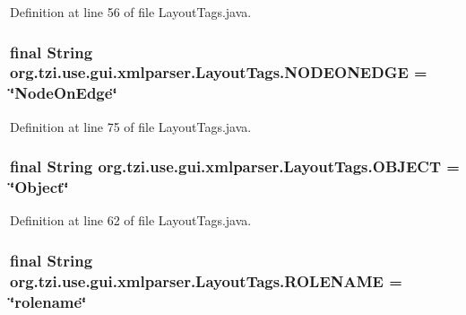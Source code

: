 Definition at line 56 of file Layout\-Tags.\-java.

\hypertarget{classorg_1_1tzi_1_1use_1_1gui_1_1xmlparser_1_1_layout_tags_a7ea68bdd3ad0a495b13864777ac5e3f7}{
\subsubsection[{N\-O\-D\-E\-O\-N\-E\-D\-G\-E}]{\setlength{\rightskip}{0pt plus 5cm}final String org.\-tzi.\-use.\-gui.\-xmlparser.\-Layout\-Tags.\-N\-O\-D\-E\-O\-N\-E\-D\-G\-E = \char`\"{}Node\-On\-Edge\char`\"{}\hspace{0.3cm}{\ttfamily [static]}}}\label{classorg_1_1tzi_1_1use_1_1gui_1_1xmlparser_1_1_layout_tags_a7ea68bdd3ad0a495b13864777ac5e3f7}


Definition at line 75 of file Layout\-Tags.\-java.

\hypertarget{classorg_1_1tzi_1_1use_1_1gui_1_1xmlparser_1_1_layout_tags_a379e9ca35e31fc181aa75deca984f338}{
\subsubsection[{O\-B\-J\-E\-C\-T}]{\setlength{\rightskip}{0pt plus 5cm}final String org.\-tzi.\-use.\-gui.\-xmlparser.\-Layout\-Tags.\-O\-B\-J\-E\-C\-T = \char`\"{}Object\char`\"{}\hspace{0.3cm}{\ttfamily [static]}}}\label{classorg_1_1tzi_1_1use_1_1gui_1_1xmlparser_1_1_layout_tags_a379e9ca35e31fc181aa75deca984f338}


Definition at line 62 of file Layout\-Tags.\-java.

\hypertarget{classorg_1_1tzi_1_1use_1_1gui_1_1xmlparser_1_1_layout_tags_a87f13bc6f6919da479f9881f1734c4a3}{
\subsubsection[{R\-O\-L\-E\-N\-A\-M\-E}]{\setlength{\rightskip}{0pt plus 5cm}final String org.\-tzi.\-use.\-gui.\-xmlparser.\-Layout\-Tags.\-R\-O\-L\-E\-N\-A\-M\-E = \char`\"{}rolename\char`\"{}\hspace{0.3cm}{\ttfamily [static]}}}\label{classorg_1_1tzi_1_1use_1_1gui_1_1xmlparser_1_1_layout_tags_a87f13bc6f6919da479f9881f1734c4a3}


